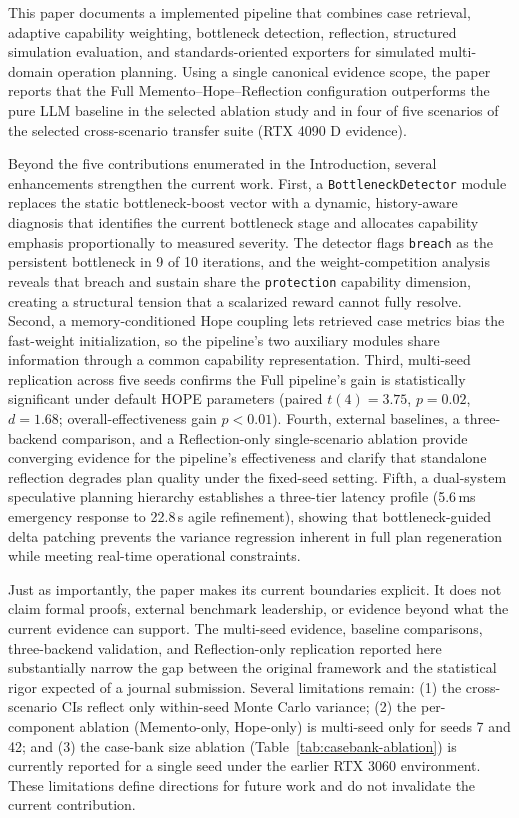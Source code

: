 This paper documents a implemented pipeline that combines case retrieval, adaptive capability weighting, bottleneck detection, reflection, structured simulation evaluation, and standards-oriented exporters for simulated multi-domain operation planning. Using a single canonical evidence scope, the paper reports that the Full Memento--Hope--Reflection configuration outperforms the pure LLM baseline in the selected ablation study and in four of five scenarios of the selected cross-scenario transfer suite (RTX 4090 D evidence).

Beyond the five contributions enumerated in the Introduction, several enhancements strengthen the current work. First, a \texttt{BottleneckDetector} module replaces the static bottleneck-boost vector with a dynamic, history-aware diagnosis that identifies the current bottleneck stage and allocates capability emphasis proportionally to measured severity. The detector flags \texttt{breach} as the persistent bottleneck in 9 of 10 iterations, and the weight-competition analysis reveals that breach and sustain share the \texttt{protection} capability dimension, creating a structural tension that a scalarized reward cannot fully resolve. Second, a memory-conditioned Hope coupling lets retrieved case metrics bias the fast-weight initialization, so the pipeline's two auxiliary modules share information through a common capability representation. Third, multi-seed replication across five seeds confirms the Full pipeline's gain is statistically significant under default HOPE parameters (paired $t(4)=3.75$, $p=0.02$, $d=1.68$; overall-effectiveness gain $p<0.01$). Fourth, external baselines, a three-backend comparison, and a Reflection-only single-scenario ablation provide converging evidence for the pipeline's effectiveness and clarify that standalone reflection degrades plan quality under the fixed-seed setting. Fifth, a dual-system speculative planning hierarchy establishes a three-tier latency profile (5.6\,ms emergency response to 22.8\,s agile refinement), showing that bottleneck-guided delta patching prevents the variance regression inherent in full plan regeneration while meeting real-time operational constraints.

Just as importantly, the paper makes its current boundaries explicit. It does not claim formal proofs, external benchmark leadership, or evidence beyond what the current evidence can support. The multi-seed evidence, baseline comparisons, three-backend validation, and Reflection-only replication reported here substantially narrow the gap between the original framework and the statistical rigor expected of a journal submission. Several limitations remain: (1) the cross-scenario CIs reflect only within-seed Monte Carlo variance; (2) the per-component ablation (Memento-only, Hope-only) is multi-seed only for seeds 7 and 42; and (3) the case-bank size ablation (Table~\ref{tab:casebank-ablation}) is currently reported for a single seed under the earlier RTX 3060 environment. These limitations define directions for future work and do not invalidate the current contribution.